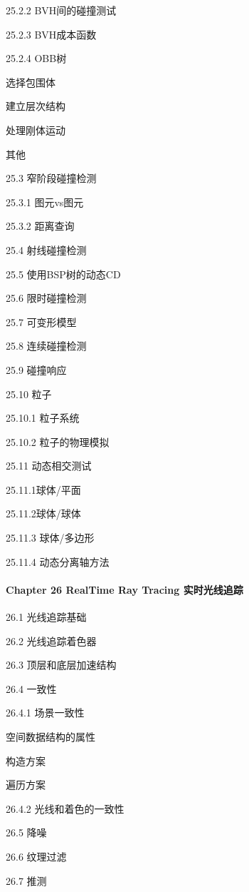 \documentclass[
  paper=a4,
  ,captions=tableheading
]{scrartcl}
\begin{document}
25.2.2 BVH间的碰撞测试

25.2.3 BVH成本函数

25.2.4 OBB树

选择包围体

建立层次结构

处理刚体运动

其他

25.3 窄阶段碰撞检测

25.3.1 图元vs图元

25.3.2 距离查询

25.4 射线碰撞检测

25.5 使用BSP树的动态CD

25.6 限时碰撞检测

25.7 可变形模型

25.8 连续碰撞检测

25.9 碰撞响应

25.10 粒子

25.10.1 粒子系统

25.10.2 粒子的物理模拟

25.11 动态相交测试

25.11.1球体/平面

25.11.2球体/球体

25.11.3 球体/多边形

25.11.4 动态分离轴方法

\paragraph{Chapter 26 RealTime Ray Tracing
实时光线追踪}\label{chapter-26-realtime-ray-tracing-ux5b9eux65f6ux5149ux7ebfux8ffdux8e2a}

26.1 光线追踪基础

26.2 光线追踪着色器

26.3 顶层和底层加速结构

26.4 一致性

26.4.1 场景一致性

空间数据结构的属性

构造方案

遍历方案

26.4.2 光线和着色的一致性

26.5 降噪

26.6 纹理过滤

26.7 推测
\end{document}
